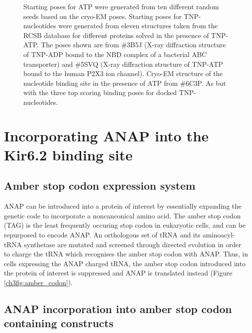 \begin{figure}[h]
{	Starting poses for ATP were generated from ten different random seeds based on the cryo-EM poses.
	Starting poses for TNP-nucleotides were generated from eleven structures taken from the RCSB database for different proteins solved in the presence of TNP-ATP.
	The poses shown are from \#3B5J (X-ray diffraction structure of TNP-ADP bound to the NBD complex of a bacterial ABC transporter) and \#5SVQ (X-ray diffraction structure of TNP-ATP bound to the human P2X3 ion channel).
	 Cryo-EM structure of the nucleotide binding site in the presence of ATP from \#6C3P.
	 As  but with the three top scoring binding poses for docked TNP-nucleotides.
	}\label{ch3fig:docking}
\end{figure}

\section{Incorporating ANAP into the Kir6.2 binding site}

\subsection{Amber stop codon expression system}

ANAP can be introduced into a protein of interest by essentially expanding the genetic code to incorporate a noncanconical amino acid.
The amber stop codon (TAG) is the least frequently occuring stop codon in eukaryotic cells, and can be repurposed to encode ANAP.
An orthologous set of tRNA and its aminoacyl-tRNA synthetase are mutated and screened through directed evolution in order to charge the tRNA which recognises the amber stop codon with ANAP.
Thus, in cells expressing the ANAP charged tRNA, the amber stop codon introduced into the protein of interest is suppressed and ANAP is translated instead (Figure \ref{ch3fig:amber_codon}).

\subsection{ANAP incorporation into amber stop codon containing constructs}

